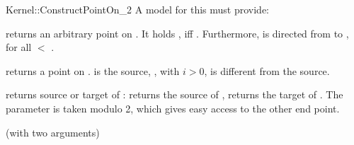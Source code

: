 \begin{ccRefFunctionObjectConcept}{Kernel::ConstructPointOn_2}
A model for this must provide:


       {returns an arbitrary point on . It holds 
        , iff .
        Furthermore,  is directed from 
        to , for all  $<$ .}

       {returns a point on .  is the source,
        , with $i>0$, is different from the 
        source. }

       {returns source or target   of :    returns
        the source of ,  returns the target of .
        The parameter  is taken modulo 2, which gives 
        easy access to the other end point. }

\ccRefines
{} (with two arguments)

\ccSeeAlso
{} \\
 \\
 \\

\end{ccRefFunctionObjectConcept}
